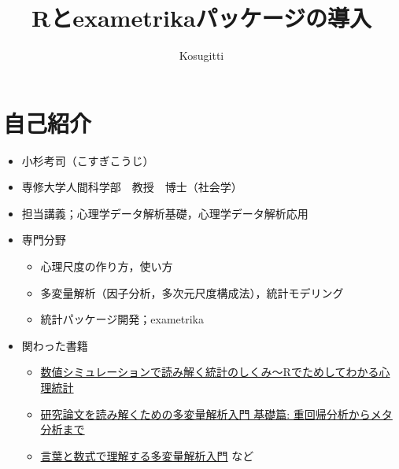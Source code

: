 \documentclass[
  a4paper,
]{ltjsbook}
\title{Rとexametrikaパッケージの導入}
\author{Kosugitti}
\date{}
\providecommand{\tightlist}{%
  \setlength{\itemsep}{0pt}\setlength{\parskip}{0pt}}\usepackage{longtable,booktabs,array}
\renewcommand*\contentsname{目次}
\newcommand\contentsname{目次}
\begin{document}
\maketitle

\renewcommand*\contentsname{目次}
{
\hypersetup{linkcolor=}
\setcounter{tocdepth}{3}
\tableofcontents
}

\section{自己紹介}\label{ux81eaux5df1ux7d39ux4ecb}

\begin{itemize}
\tightlist
\item
  小杉考司（こすぎこうじ）
\item
  専修大学人間科学部　教授　博士（社会学）
\item
  担当講義；心理学データ解析基礎，心理学データ解析応用
\item
  専門分野

  \begin{itemize}
  \tightlist
  \item
    心理尺度の作り方，使い方
  \item
    多変量解析（因子分析，多次元尺度構成法），統計モデリング
  \item
    統計パッケージ開発；exametrika
  \end{itemize}
\item
  関わった書籍

  \begin{itemize}
  \tightlist
  \item
    \href{https://amzn.to/3XlA5Gq}{数値シミュレーションで読み解く統計のしくみ〜Rでためしてわかる心理統計}
  \item
    \href{https://amzn.to/3EWhLNY}{研究論文を読み解くための多変量解析入門
    基礎篇: 重回帰分析からメタ分析まで}
  \item
    \href{https://amzn.to/4gYB32u}{言葉と数式で理解する多変量解析入門}
    など
  \end{itemize}
\end{itemize}
\end{document}
